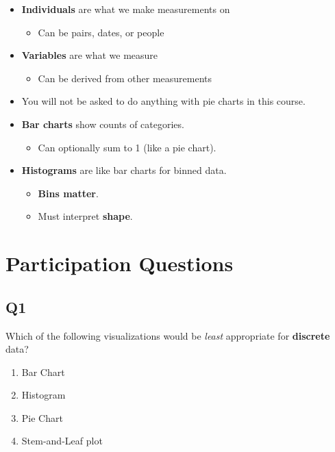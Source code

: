 \documentclass[
  letterpaper,
  DIV=11,
  numbers=noendperiod]{scrreprt}
\providecommand{\tightlist}{%
  \setlength{\itemsep}{0pt}\setlength{\parskip}{0pt}}\usepackage{longtable,booktabs,array}
\begin{document}
\begin{itemize}
\tightlist
\item
  \textbf{Individuals} are what we make measurements on

  \begin{itemize}
  \tightlist
  \item
    Can be pairs, dates, or people
  \end{itemize}
\item
  \textbf{Variables} are what we measure

  \begin{itemize}
  \tightlist
  \item
    Can be derived from other measurements
  \end{itemize}
\item
  You will not be asked to do anything with pie charts in this course.
\item
  \textbf{Bar charts} show counts of categories.

  \begin{itemize}
  \tightlist
  \item
    Can optionally sum to 1 (like a pie chart).
  \end{itemize}
\item
  \textbf{Histograms} are like bar charts for binned data.

  \begin{itemize}
  \tightlist
  \item
    \textbf{Bins matter}.
  \item
    Must interpret \textbf{shape}.
  \end{itemize}
\end{itemize}

\hypertarget{participation-questions}{%
\section{Participation Questions}\label{participation-questions}}

\hypertarget{q1}{%
\subsection{Q1}\label{q1}}

Which of the following visualizations would be \emph{least} appropriate
for \textbf{discrete} data?

\begin{enumerate}
\def\labelenumi{\arabic{enumi}.}
\tightlist
\item
  Bar Chart
\item
  Histogram
\item
  Pie Chart
\item
  Stem-and-Leaf plot
\end{enumerate}
\end{document}
